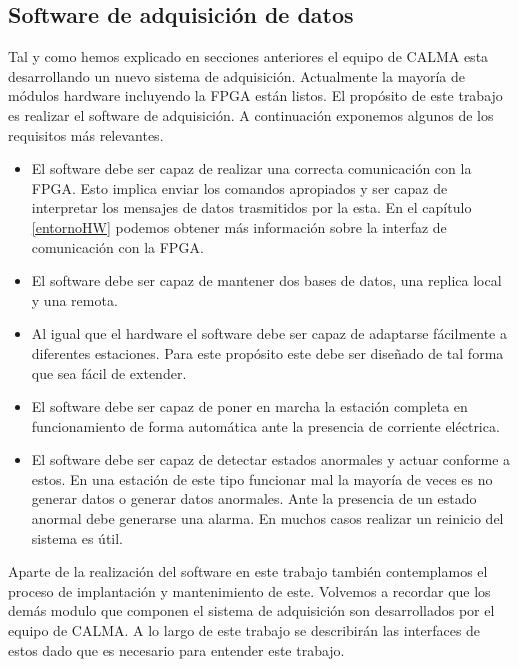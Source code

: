 	\subsection{Software de adquisición de datos}
		Tal y como hemos explicado en secciones anteriores el equipo de CALMA esta desarrollando un nuevo sistema de adquisición. Actualmente
		la mayoría de módulos hardware incluyendo la FPGA están listos. El propósito de este trabajo es realizar el software de adquisición. A
		continuación exponemos algunos de los requisitos más relevantes.
		\begin{itemize}
			\item 	El software debe ser capaz de realizar una correcta comunicación con la FPGA. Esto implica enviar los comandos
				apropiados y ser capaz de interpretar los mensajes de datos trasmitidos por la esta. En el capítulo \ref{entornoHW}
				podemos obtener más información sobre la interfaz de comunicación con la FPGA.
			\item 	El software debe ser capaz de mantener dos bases de datos, una replica local y una remota.
			\item 	Al igual que el hardware el software debe ser capaz de adaptarse fácilmente a diferentes estaciones. Para este
				propósito este debe ser diseñado de tal forma que sea fácil de extender.
			\item 	El software debe ser capaz de poner en marcha la estación completa en funcionamiento de forma automática ante la
			  	presencia de corriente eléctrica. 
			\item 	El software debe ser capaz de detectar estados anormales y actuar conforme a estos. En una estación de este tipo
				funcionar mal la mayoría de veces es no generar datos o generar datos anormales. Ante la presencia de un estado
				anormal debe generarse una alarma. En muchos casos realizar un reinicio del sistema es útil. 
		\end{itemize}
		Aparte de la realización del software en este trabajo también contemplamos el proceso de implantación y mantenimiento de este.
		Volvemos a recordar que los demás modulo que componen el sistema de adquisición son desarrollados por el equipo de CALMA. A lo largo
		de este trabajo se describirán las interfaces de estos dado que es necesario para entender este trabajo. 
